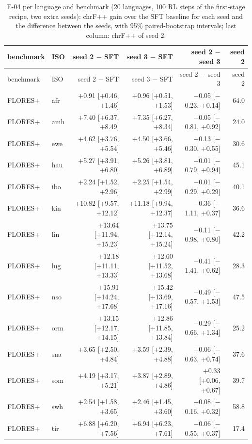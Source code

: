 {\scriptsize\setlength{\tabcolsep}{1.5pt}
\begin{longtable}{@{}llrrrr@{}}
\caption{E-04 per language and benchmark (20 languages, 100 RL steps of the first-stage recipe, two extra seeds): chrF++ gain over the SFT baseline for each seed and the difference between the seeds, with 95\% paired-bootstrap intervals; last column: chrF++ of seed 2.}\label{tab:e04-per-language}\\
\toprule
benchmark & ISO & seed 2 $-$ SFT & seed 3 $-$ SFT & seed 2 $-$ seed 3 & seed 2 \\
\midrule\endfirsthead
\toprule
benchmark & ISO & seed 2 $-$ SFT & seed 3 $-$ SFT & seed 2 $-$ seed 3 & seed 2 \\
\midrule\endhead
\midrule\endfoot
\bottomrule\endlastfoot
FLORES+ & afr & +0.91 [+0.46, +1.46] & +0.96 [+0.51, +1.53] & $-$0.05 [$-$0.23, +0.14] & 64.0 \\
FLORES+ & amh & +7.40 [+6.37, +8.49] & +7.35 [+6.27, +8.34] & +0.05 [$-$0.81, +0.92] & 24.0 \\
FLORES+ & ewe & +4.62 [+3.76, +5.54] & +4.50 [+3.66, +5.46] & +0.13 [$-$0.30, +0.55] & 30.6 \\
FLORES+ & hau & +5.27 [+3.91, +6.80] & +5.26 [+3.81, +6.89] & +0.01 [$-$0.79, +0.94] & 45.1 \\
FLORES+ & ibo & +2.24 [+1.52, +2.96] & +2.25 [+1.54, +2.99] & $-$0.01 [$-$0.29, +0.29] & 40.1 \\
FLORES+ & kin & +10.82 [+9.57, +12.12] & +11.18 [+9.94, +12.37] & $-$0.36 [$-$1.11, +0.37] & 36.6 \\
FLORES+ & lin & +13.64 [+11.94, +15.23] & +13.75 [+12.14, +15.24] & $-$0.11 [$-$0.98, +0.80] & 42.2 \\
FLORES+ & lug & +12.18 [+11.11, +13.33] & +12.60 [+11.52, +13.68] & $-$0.41 [$-$1.41, +0.62] & 28.3 \\
FLORES+ & nso & +15.91 [+14.24, +17.68] & +15.42 [+13.69, +17.16] & +0.49 [$-$0.57, +1.53] & 47.5 \\
FLORES+ & orm & +13.15 [+12.17, +14.15] & +12.86 [+11.85, +13.84] & +0.29 [$-$0.66, +1.34] & 25.2 \\
FLORES+ & sna & +3.65 [+2.50, +4.84] & +3.59 [+2.39, +4.88] & +0.06 [$-$0.63, +0.74] & 37.6 \\
FLORES+ & som & +4.19 [+3.17, +5.21] & +3.87 [+2.89, +4.86] & +0.33 [+0.06, +0.67] & 39.7 \\
FLORES+ & swh & +2.54 [+1.58, +3.65] & +2.46 [+1.45, +3.60] & +0.08 [$-$0.16, +0.32] & 58.8 \\
FLORES+ & tir & +6.88 [+6.20, +7.56] & +6.94 [+6.23, +7.61] & $-$0.06 [$-$0.55, +0.37] & 17.4 \\

\end{longtable}}
